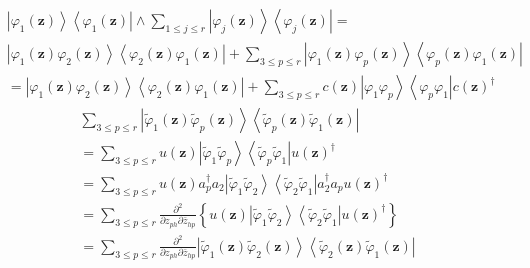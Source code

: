 \documentclass[aps,preprint]{revtex4}%
\begin{document}
\begin{align}
&  \left\vert \varphi_{1}\left(  \mathbf{z}\right)  \right\rangle \left\langle
\varphi_{1}\left(  \mathbf{z}\right)  \right\vert \wedge\sum\limits_{1\leq
j\leq r}\left\vert \varphi_{j}\left(  \mathbf{z}\right)  \right\rangle
\left\langle \varphi_{j}\left(  \mathbf{z}\right)  \right\vert =\\
&  \left\vert \varphi_{1}\left(  \mathbf{z}\right)  \varphi_{2}\left(
\mathbf{z}\right)  \right\rangle \left\langle \varphi_{2}\left(
\mathbf{z}\right)  \varphi_{1}\left(  \mathbf{z}\right)  \right\vert
+\sum\limits_{3\leq p\leq r}\left\vert \varphi_{1}\left(  \mathbf{z}\right)
\varphi_{p}\left(  \mathbf{z}\right)  \right\rangle \left\langle \varphi
_{p}\left(  \mathbf{z}\right)  \varphi_{1}\left(  \mathbf{z}\right)
\right\vert \\
&  =\left\vert \varphi_{1}\left(  \mathbf{z}\right)  \varphi_{2}\left(
\mathbf{z}\right)  \right\rangle \left\langle \varphi_{2}\left(
\mathbf{z}\right)  \varphi_{1}\left(  \mathbf{z}\right)  \right\vert
+\sum\limits_{3\leq p\leq r}c\left(  \mathbf{z}\right)  \left\vert \varphi
_{1}\varphi_{p}\right\rangle \left\langle \varphi_{p}\varphi_{1}\right\vert
c\left(  \mathbf{z}\right)  ^{\dagger}%
\end{align}%
\begin{align}
&  \sum\limits_{3\leq p\leq r}\left\vert \tilde{\varphi}_{1}\left(
\mathbf{z}\right)  \tilde{\varphi}_{p}\left(  \mathbf{z}\right)  \right\rangle
\left\langle \tilde{\varphi}_{p}\left(  \mathbf{z}\right)  \tilde{\varphi}%
_{1}\left(  \mathbf{z}\right)  \right\vert \\
&  =\sum\limits_{3\leq p\leq r}u\left(  \mathbf{z}\right)  \left\vert
\tilde{\varphi}_{1}\tilde{\varphi}_{p}\right\rangle \left\langle
\tilde{\varphi}_{p}\tilde{\varphi}_{1}\right\vert u\left(  \mathbf{z}\right)
^{\dagger}\\
&  =\sum\limits_{3\leq p\leq r}u\left(  \mathbf{z}\right)  a_{p}^{\dagger
}a_{2}\left\vert \tilde{\varphi}_{1}\tilde{\varphi}_{2}\right\rangle
\left\langle \tilde{\varphi}_{2}\tilde{\varphi}_{1}\right\vert a_{2}^{\dagger
}a_{p}u\left(  \mathbf{z}\right)  ^{\dagger}\\
&  =\sum\limits_{3\leq p\leq r}\frac{\partial^{2}}{\partial z_{ph}\partial
\bar{z}_{hp}}\left\{  u\left(  \mathbf{z}\right)  \left\vert \tilde{\varphi
}_{1}\tilde{\varphi}_{2}\right\rangle \left\langle \tilde{\varphi}_{2}%
\tilde{\varphi}_{1}\right\vert u\left(  \mathbf{z}\right)  ^{\dagger}\right\}
\\
&  =\sum\limits_{3\leq p\leq r}\frac{\partial^{2}}{\partial z_{ph}\partial
\bar{z}_{hp}}\left\vert \tilde{\varphi}_{1}\left(  \mathbf{z}\right)
\tilde{\varphi}_{2}\left(  \mathbf{z}\right)  \right\rangle \left\langle
\tilde{\varphi}_{2}\left(  \mathbf{z}\right)  \tilde{\varphi}_{1}\left(
\mathbf{z}\right)  \right\vert
\end{align}%
\end{document}
